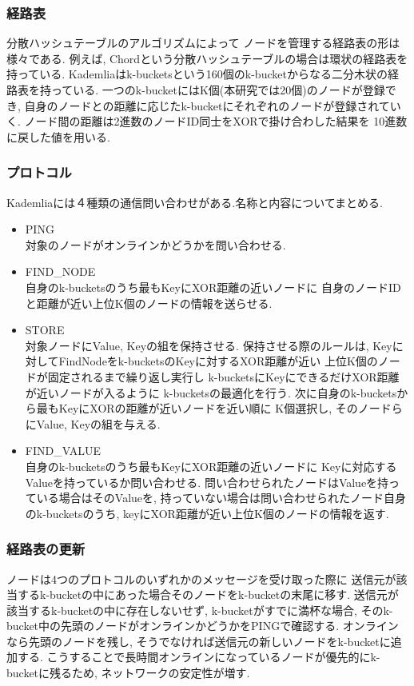 \documentclass[sotsuron]{jcsie}
\begin{document}
\subsubsection{経路表}
分散ハッシュテーブルのアルゴリズムによって
ノードを管理する経路表の形は様々である.
例えば, Chordという分散ハッシュテーブルの場合は環状の経路表を持っている.
Kademliaはk-bucketsという160個のk-bucketからなる二分木状の経路表を持っている.
一つのk-bucketにはK個(本研究では20個)のノードが登録でき, 
自身のノードとの距離に応じたk-bucketにそれぞれのノードが登録されていく.
ノード間の距離は2進数のノードID同士をXORで掛け合わした結果を
10進数に戻した値を用いる.

\subsubsection{プロトコル}
Kademliaには４種類の通信問い合わせがある.名称と内容についてまとめる.
\begin{itemize}
	\item {PING}\\
		  対象のノードがオンラインかどうかを問い合わせる.\\
	\item {FIND\_NODE}\\
	      自身のk-bucketsのうち最もKeyにXOR距離の近いノードに
	      自身のノードIDと距離が近い上位K個のノードの情報を送らせる.\\
	\item {STORE}\\
	      対象ノードにValue, Keyの組を保持させる.
		  保持させる際のルールは, 
		  Keyに対してFindNodeをk-bucketsのKeyに対するXOR距離が近い
		  上位K個のノードが固定されるまで繰り返し実行し
		  k-bucketsにKeyにできるだけXOR距離が近いノードが入るように
		  k-bucketsの最適化を行う.
		  次に自身のk-bucketsから最もKeyにXORの距離が近いノードを近い順に
		  K個選択し, そのノードらにValue, Keyの組を与える.\\	
	\item {FIND\_VALUE}\\
	      自身のk-bucketsのうち最もKeyにXOR距離の近いノードに
	      Keyに対応するValueを持っているか問い合わせる.
	      問い合わせられたノードはValueを持っている場合はそのValueを, 
	      持っていない場合は問い合わせられたノード自身のk-bucketsのうち, 
	      keyにXOR距離が近い上位K個のノードの情報を返す.\\
\end{itemize}

\subsubsection{経路表の更新}
ノードは4つのプロトコルのいずれかのメッセージを受け取った際に
送信元が該当するk-bucketの中にあった場合そのノードをk-bucketの末尾に移す.
送信元が該当するk-bucketの中に存在しないせず, k-bucketがすでに満杯な場合, 
そのk-bucket中の先頭のノードがオンラインかどうかをPINGで確認する.
オンラインなら先頭のノードを残し, 
そうでなければ送信元の新しいノードをk-bucketに追加する.
こうすることで長時間オンラインになっているノードが優先的にk-bucketに残るため, 
ネットワークの安定性が増す.
\end{document}
